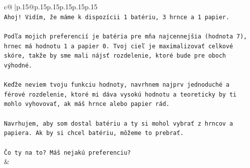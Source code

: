 \documentclass{article}
\begin{document}
{\begin{supertabular}{c@{$\;$}|p{.15\linewidth}@{}p{.15\linewidth}p{.15\linewidth}p{.15\linewidth}p{.15\linewidth}p{.15\linewidth}}
{{{\\ 
\texttt{Ahoj! Vidím, že máme k dispozícii 1 batériu, 3 hrnce a 1 papier.} \\
\\ 
\texttt{Podľa mojich preferencií je batéria pre mňa najcennejšia (hodnota 7), hrnec má hodnotu 1 a papier 0. Tvoj cieľ je maximalizovať celkové skóre, takže by sme mali nájsť rozdelenie, ktoré bude pre oboch výhodné.} \\
\\ 
\texttt{Keďže neviem tvoju funkciu hodnoty, navrhnem najprv jednoduché a férové rozdelenie, ktoré mi dáva vysokú hodnotu a teoreticky by ti mohlo vyhovovať, ak máš hrnce alebo papier rád.} \\
\\ 
\texttt{Navrhujem, aby som dostal batériu a ty si mohol vybrať z hrncov a papiera. Ak by si chcel batériu, môžeme to prebrať.} \\
\\ 
\texttt{Čo ty na to? Máš nejakú preferenciu?} \\
            }
        }
    }
    & \\ \\


\end{supertabular}}
\end{document}
